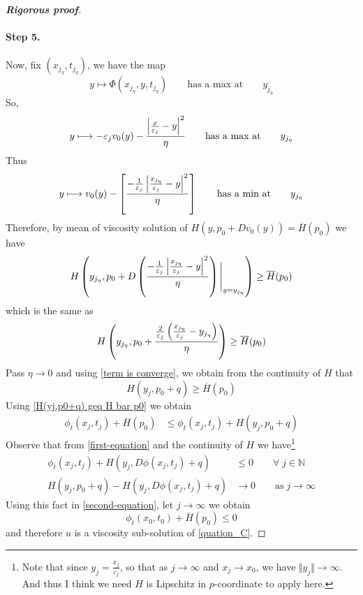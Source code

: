 \documentclass[12pt, oneside]{amsart}  	%
\begin{document}
\begin{proof}[\textbf{Rigorous proof}]
\paragraph{\textbf{Step 5.}}	 Now, fix $(x_{j_\eta}, t_{j_\eta})$, we have the map
\begin{equation*}
y\longmapsto \Phi(x_{j_\eta}, y, t_{j_\eta})\qquad\text{has a max at}\qquad y_{j_\eta}
\end{equation*}
So,
\begin{equation*}
y\longmapsto -\varepsilon_j v_0(y) - \frac{\left|\frac{x}{\varepsilon_j} - y\right|^2}{\eta}\qquad\text{has a max at}\qquad y_{j_\eta}
\end{equation*}
Thus
\begin{equation*}
y\longmapsto  v_0(y) - \left[\frac{-\frac{1}{\varepsilon_j}\left|\frac{x_{j_\eta}}{\varepsilon_j} - y\right|^2}{\eta}\right]\qquad\text{has a min at}\qquad y_{j_\eta}
\end{equation*}
Therefore, by mean of viscosity solution of $H(y,p_0+Dv_0(y)) = \overline{H}(p_0)$ we have
\begin{equation*}
H\left(y_{j_\eta}, p_0 + D\left(\frac{ -\frac{1}{\varepsilon_j} \left|\frac{x_{j_\eta}}{\varepsilon_j} - y\right|^2}{\eta}\right)\Bigg|_{y = y_{j_\eta}}\right) \geq \overline{H}(p_0) 
\end{equation*}
which is the same as
\begin{equation*}
 H\left(y_{j_\eta}, p_0 +\frac{\frac{2}{\varepsilon_j}\left(\frac{x_{j_\eta}}{\varepsilon_j} - y_{j_\eta}\right)}{\eta} \right) \geq \overline{H}(p_0)
\end{equation*}
Pass $\eta \longrightarrow 0$ and using \eqref{term is converge}, we obtain from the continuity of $H$ that
\begin{equation}\label{H(yj,p0+q) geq H bar p0}
H\left(y_j, p_0+ q\right)\geq \overline{H}(p_0)
\end{equation}
Using \eqref{H(yj,p0+q) geq H bar p0} we obtain %
\begin{align}\label{second-equation}
\phi_t\left(x_j,t_j\right) + \overline{H}(p_0) &\leq \phi_t\left(x_j,t_j\right) + H\left(y_j,p_0 + q\right) 
\end{align}
Observe that from \eqref{first-equation} and the continuity of $H$ we have\footnote{Note that since $y_j = \frac{x_j}{\varepsilon_j}$, so that as $j\longrightarrow\infty$ and $x_j\longrightarrow x_0$, we have $\Vert y_j\Vert\longrightarrow \infty$. And thus I think we need $H$ is Lipschitz in $p$-coordinate to apply here.}
\begin{align*}
\phi_t(x_j,t_j) + H(y_j,D\phi(x_j,t_j) + q) &\leq 0 \qquad\forall\; j\in \mathbb{N}\\
H\left(y_j,p_0 + q\right) - H(y_j,D\phi(x_j,t_j) + q) &\longrightarrow 0 \qquad\text{as}\;j\longrightarrow\infty
\end{align*}
Using this fact in \eqref{second-equation}, let $j\longrightarrow \infty$ we obtain 
\begin{equation*}
\phi_t(x_0,t_0) + \overline{H}(p_0) \leq 0
\end{equation*}
and therefore $u$ is a viscosity sub-solution of \eqref{quation_C}.
\end{proof}
\end{document}
